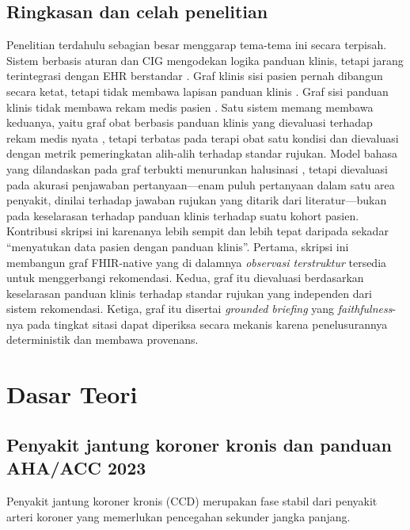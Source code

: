 \subsection{Ringkasan dan celah penelitian}
Penelitian terdahulu sebagian besar menggarap tema-tema ini secara terpisah. Sistem berbasis
aturan dan CIG mengodekan logika panduan klinis, tetapi jarang terintegrasi dengan EHR berstandar
\cite{papadopoulos2022}. Graf klinis sisi pasien pernah dibangun secara ketat, tetapi
tidak membawa lapisan panduan klinis \cite{xiao2022}. Graf sisi panduan klinis tidak membawa rekam medis
pasien \cite{cui2025}. Satu sistem memang membawa keduanya, yaitu graf obat berbasis panduan klinis
yang dievaluasi terhadap rekam medis nyata \cite{zhou2022}, tetapi terbatas pada terapi obat
satu kondisi dan dievaluasi dengan metrik pemeringkatan alih-alih terhadap standar rujukan.
Model bahasa yang dilandaskan pada graf terbukti menurunkan halusinasi
\cite{ali2026}, tetapi dievaluasi pada akurasi penjawaban pertanyaan---enam puluh
pertanyaan dalam satu area penyakit, dinilai terhadap jawaban rujukan yang ditarik dari
literatur---bukan pada keselarasan terhadap panduan klinis terhadap suatu kohort pasien. Kontribusi skripsi ini karenanya lebih sempit dan lebih tepat daripada sekadar ``menyatukan
data pasien dengan panduan klinis''. Pertama, skripsi ini membangun graf FHIR-native yang di
dalamnya \emph{observasi terstruktur} tersedia untuk menggerbangi rekomendasi. Kedua, graf
itu dievaluasi berdasarkan keselarasan panduan klinis terhadap standar rujukan yang
independen dari sistem rekomendasi. Ketiga, graf itu disertai \emph{grounded briefing} yang
\emph{faithfulness}-nya pada tingkat sitasi dapat diperiksa secara mekanis karena
penelusurannya deterministik dan membawa provenans.

\section{Dasar Teori}

\subsection{Penyakit jantung koroner kronis dan panduan AHA/ACC 2023}
Penyakit jantung koroner kronis (CCD) merupakan fase stabil dari penyakit arteri koroner yang
memerlukan pencegahan sekunder jangka panjang.

